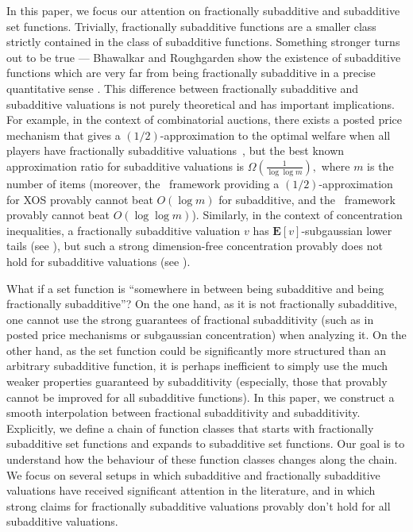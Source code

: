 \documentclass[11pt]{article}%
\numberwithin{theorem}{subsection}
\newcommand{\expect}{\mathbf{E}}
\begin{document}
In this paper, we focus our attention on fractionally subadditive and subadditive set functions. Trivially, fractionally subadditive functions are a smaller class strictly contained in the class of subadditive functions. Something stronger turns out to be true --- Bhawalkar and Roughgarden show the existence of subadditive functions which are very far from being fractionally subadditive in a precise quantitative sense \cite{BhawalkarR11}. This difference between fractionally subadditive and subadditive valuations is not purely theoretical and has important implications. For example, in the context of combinatorial auctions, there exists a posted price mechanism that gives a $(1/2)$-approximation to the optimal welfare when all players have fractionally subadditive valuations~\cite{FeldmanGL15}, but the best known approximation ratio for subadditive valuations is $\Omega(\frac{1}{\log \log m}),$ where $m$ is the number of items \cite{DuttingKL20} (moreover, the~\cite{FeldmanGL15} framework providing a $(1/2)$-approximation for XOS provably cannot beat $O(\log m)$ for subadditive, and the~\cite{DuttingKL20} framework provably cannot beat $O(\log \log m)$). Similarly, in the context of concentration inequalities, a fractionally subadditive valuation $v$ has $\expect[v]$-subgaussian lower tails (see \cite[Corollary 3.2]{Vondrak10}), but such a strong dimension-free concentration provably does not hold for subadditive valuations (see \cite[Section 4]{Vondrak10}).

What if a set function is ``somewhere in between being subadditive and being fractionally subadditive''? On the one hand, as it is not fractionally subadditive, one cannot use the strong guarantees of fractional subadditivity (such as in posted price mechanisms or subgaussian concentration) when analyzing it. On the other hand, as the set function could be significantly more structured than an arbitrary subadditive function, it is perhaps inefficient to simply use the much weaker properties guaranteed by subadditivity (especially, those that provably cannot be improved for all subadditive functions). In this paper, we construct a smooth interpolation between fractional subadditivity and subadditivity. Explicitly, we define a chain of function classes that starts with fractionally subadditive set functions and expands to subadditive set functions. Our goal is to understand how the behaviour of these function classes changes along the chain. We focus on several setups in which subadditive and fractionally subadditive valuations have received significant attention in the literature, and in which strong claims for fractionally subadditive valuations provably don't hold for all subadditive valuations.
\end{document}
